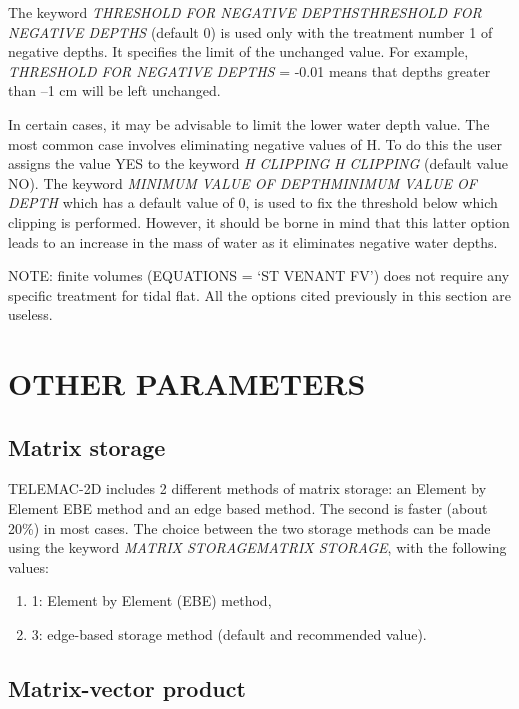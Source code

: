  The keyword \textit{THRESHOLD FOR NEGATIVE DEPTHSTHRESHOLD FOR NEGATIVE DEPTHS} (default 0) is used only with the treatment number 1 of negative depths. It specifies the limit of the unchanged value. For example, \textit{THRESHOLD FOR NEGATIVE DEPTHS} = -0.01 means that depths greater than --1 cm will be left unchanged.

 In certain cases, it may be advisable to limit the lower water depth value. The most common case involves eliminating negative values of H. To do this the user assigns the value YES to the keyword \textit{H CLIPPING} \textit{H CLIPPING} (default value NO). The keyword \textit{MINIMUM VALUE OF DEPTHMINIMUM VALUE OF DEPTH} which has a default value of 0, is used to fix the threshold below which clipping is performed. However, it should be borne in mind that this latter option leads to an increase in the mass of water as it eliminates negative water depths.

 NOTE: finite volumes (EQUATIONS = `ST VENANT FV') does not require any specific treatment for tidal flat. All the options cited previously in this section are useless.


\section{ OTHER PARAMETERS}


\subsection{ Matrix storage}

 TELEMAC-2D includes 2 different methods of matrix storage: an Element by Element EBE method and an edge based method. The second is faster (about 20\%) in most cases. The choice between the two storage methods can be made using the keyword \textit{MATRIX STORAGEMATRIX STORAGE}, with the following values:

\begin{enumerate}
\item [\nonumber]  1: Element by Element (EBE) method,

\item [\nonumber] 3: edge-based storage method (default and recommended value).
\end{enumerate}


\subsection{ Matrix-vector product}


